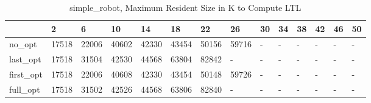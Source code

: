 \begin{table}
\caption{simple_robot, Maximum Resident Size in K to Compute LTL}
\label{simple_robot_LTL_size}
\begin{tabular}{llllllllllllll}
\toprule
 & 2 & 6 & 10 & 14 & 18 & 22 & 26 & 30 & 34 & 38 & 42 & 46 & 50 \\
\midrule
no_opt & 17518 & 22006 & 40602 & 42330 & 43454 & 50156 & 59716 & - & - & - & - & - & - \\
last_opt & 17518 & 31504 & 42530 & 44568 & 63804 & 82842 & - & - & - & - & - & - & - \\
first_opt & 17518 & 22006 & 40608 & 42330 & 43454 & 50148 & 59726 & - & - & - & - & - & - \\
full_opt & 17518 & 31502 & 42526 & 44568 & 63806 & 82840 & - & - & - & - & - & - & - \\
\bottomrule
\end{tabular}
\end{table}
